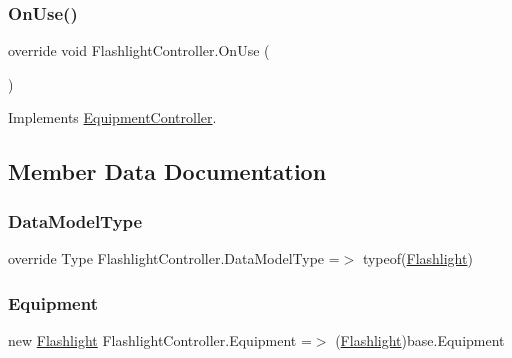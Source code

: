 \mbox{\label{class_flashlight_controller_aec521de4f68b86b7c48a9757119ed099}} 
\subsubsection{\texorpdfstring{On\+Use()}{OnUse()}}
{\footnotesize\ttfamily override void Flashlight\+Controller.\+On\+Use (\begin{DoxyParamCaption}{ }\end{DoxyParamCaption})\hspace{0.3cm}{\ttfamily [virtual]}}



Implements \mbox{\hyperlink{class_equipment_controller_ad15c45b6812eaefdaf26636ed8c45ab4}{Equipment\+Controller}}.



\subsection{Member Data Documentation}
\mbox{\label{class_flashlight_controller_a30629c2b9854407919c41b09c0c31cc9}} 
\subsubsection{\texorpdfstring{Data\+Model\+Type}{DataModelType}}
{\footnotesize\ttfamily override Type Flashlight\+Controller.\+Data\+Model\+Type =$>$ typeof(\mbox{\hyperlink{class_flashlight}{Flashlight}})\hspace{0.3cm}{\ttfamily [protected]}}

\mbox{\label{class_flashlight_controller_a4fc07eb15877d1ae91b632cc77e77c36}} 
\subsubsection{\texorpdfstring{Equipment}{Equipment}}
{\footnotesize\ttfamily new \mbox{\hyperlink{class_flashlight}{Flashlight}} Flashlight\+Controller.\+Equipment =$>$ (\mbox{\hyperlink{class_flashlight}{Flashlight}})base.\+Equipment}

